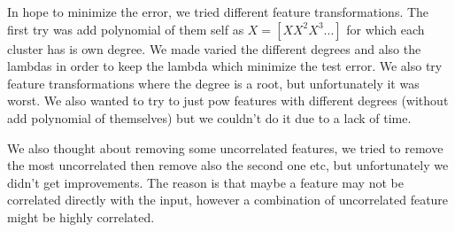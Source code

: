 \documentclass{article} %
\begin{document}
In hope to minimize the error, we tried different feature transformations. The first try was add polynomial of them self as $X = [X X^2 X^3 ...]$ for which each cluster has is own degree. We made varied the different degrees and also the lambdas in order to keep the lambda which minimize the test error. We also try feature transformations where the degree is a root, but unfortunately it was worst. We also wanted to try to just pow features with different degrees (without add polynomial of themselves) but we couldn't do it due to a lack of time.

We also thought about removing some uncorrelated features, we tried to remove the most uncorrelated then remove also the second one etc, but unfortunately we didn't get improvements. The reason is that maybe a feature may not be correlated directly with the input, however a combination of uncorrelated feature might be highly correlated.
\end{document}
